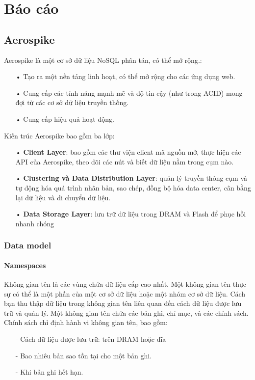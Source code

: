 \documentclass[a4paper,12pt]{report}
\begin{document}
\chapter*{Báo cáo}
\section*{Aerospike}
Aerospike là một cơ sở dữ liệu NoSQL phân tán, có thể mở rộng.:
\begin{itemize}
\item[•] Tạo ra một nền tảng linh hoạt, có thể mở rộng cho các ứng dụng web.
\item[•] Cung cấp các tính năng mạnh mẽ và độ tin cậy (như trong ACID) mong đợi từ các cơ sở dữ liệu truyền thống.
\item[•] Cung cấp hiệu quả hoạt động.
\end{itemize}
Kiến trúc Aerospike bao gồm ba lớp:
\begin{itemize}
\item[•] \textbf{Client Layer}:  bao gồm các thư viện client mã nguồn mở, thực hiện các API của Aerospike, theo dõi  các nút và biết dữ liệu nằm trong cụm nào.
\item[•] \textbf{ Clustering và Data Distribution Layer}: quản lý truyền thông cụm và tự động hóa quá trình nhân bản, sao chép, đồng bộ hóa data center, cân bằng lại dữ liệu và di chuyển dữ liệu.
\item[•] \textbf{ Data Storage Layer}: lưu trữ dữ liệu trong DRAM và Flash để phục hồi nhanh chóng
\end{itemize}
\subsection*{Data model}
\subsubsection*{Namespaces}
Không gian tên là các vùng chứa dữ liệu cấp cao nhất. Một không gian tên thực sự có thể là một phần của một cơ sở dữ liệu hoặc một nhóm cơ sở dữ liệu. Cách bạn thu thập dữ liệu trong không gian tên liên quan đến cách dữ liệu được lưu trữ và quản lý. Một không gian tên chứa các bản ghi, chỉ mục, và các chính sách. Chính sách chỉ định hành vi không gian tên, bao gồm:
\begin{itemize}
\item[-] Cách dữ liệu được lưu trữ: trên DRAM hoặc đĩa
\item[-] Bao nhiêu bản sao tồn tại cho một bản ghi.
\item[-] Khi bản ghi hết hạn.
\end{itemize}
\end{document}
